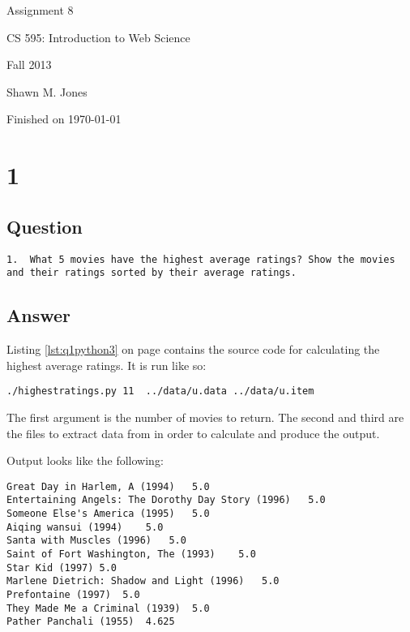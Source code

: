 \documentclass[letterpaper,11pt]{article}
\begin{document}
\begin{titlepage}

\begin{center}

\Huge{Assignment 8}

\Large{CS 595:  Introduction to Web Science}

\Large{Fall 2013}

\Large{Shawn M. Jones}

\Large Finished on \today

\end{center}

\end{titlepage}

\newpage


\newpage
\section*{1}

\subsection*{Question}

\begin{verbatim}
1.  What 5 movies have the highest average ratings? Show the movies
and their ratings sorted by their average ratings.
\end{verbatim}

\subsection*{Answer}

Listing \ref{lst:q1python3} on page \pageref{lst:q1python3} contains the source code for calculating the highest average ratings.  It is run like so:
\begin{lstlisting}[frame=single]
./highestratings.py 11  ../data/u.data ../data/u.item
\end{lstlisting}

The first argument is the number of movies to return.  The second and third are the files to extract data from in order to calculate and produce the output.

Output looks like the following:
\begin{lstlisting}[frame=single]
Great Day in Harlem, A (1994)	5.0
Entertaining Angels: The Dorothy Day Story (1996)	5.0
Someone Else's America (1995)	5.0
Aiqing wansui (1994)	5.0
Santa with Muscles (1996)	5.0
Saint of Fort Washington, The (1993)	5.0
Star Kid (1997)	5.0
Marlene Dietrich: Shadow and Light (1996) 	5.0
Prefontaine (1997)	5.0
They Made Me a Criminal (1939)	5.0
Pather Panchali (1955)	4.625
\end{lstlisting}
\end{document}
